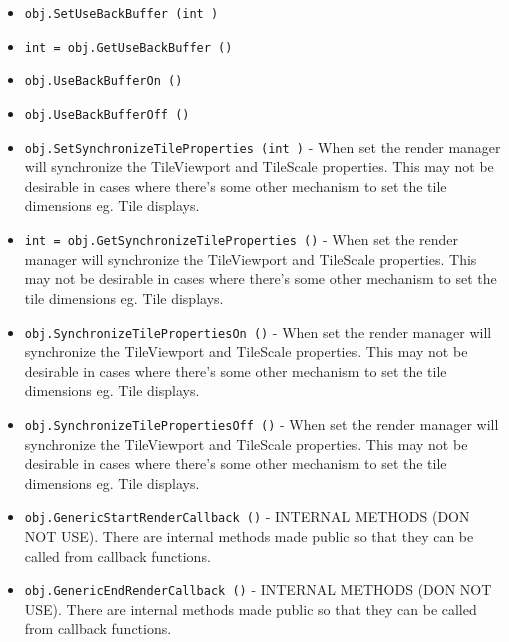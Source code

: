 \begin{itemize}
\item  \verb|obj.SetUseBackBuffer (int )|

\item  \verb|int = obj.GetUseBackBuffer ()|

\item  \verb|obj.UseBackBufferOn ()|

\item  \verb|obj.UseBackBufferOff ()|

\item  \verb|obj.SetSynchronizeTileProperties (int )| -  When set the render manager will synchronize the TileViewport and TileScale
 properties. This may not be desirable in cases where there's some other
 mechanism to set the tile dimensions eg. Tile displays.

\item  \verb|int = obj.GetSynchronizeTileProperties ()| -  When set the render manager will synchronize the TileViewport and TileScale
 properties. This may not be desirable in cases where there's some other
 mechanism to set the tile dimensions eg. Tile displays.

\item  \verb|obj.SynchronizeTilePropertiesOn ()| -  When set the render manager will synchronize the TileViewport and TileScale
 properties. This may not be desirable in cases where there's some other
 mechanism to set the tile dimensions eg. Tile displays.

\item  \verb|obj.SynchronizeTilePropertiesOff ()| -  When set the render manager will synchronize the TileViewport and TileScale
 properties. This may not be desirable in cases where there's some other
 mechanism to set the tile dimensions eg. Tile displays.

\item  \verb|obj.GenericStartRenderCallback ()| -  INTERNAL METHODS (DON NOT USE).
 There are internal methods made public so that they can be called from
 callback functions.

\item  \verb|obj.GenericEndRenderCallback ()| -  INTERNAL METHODS (DON NOT USE).
 There are internal methods made public so that they can be called from
 callback functions.

\end{itemize}
